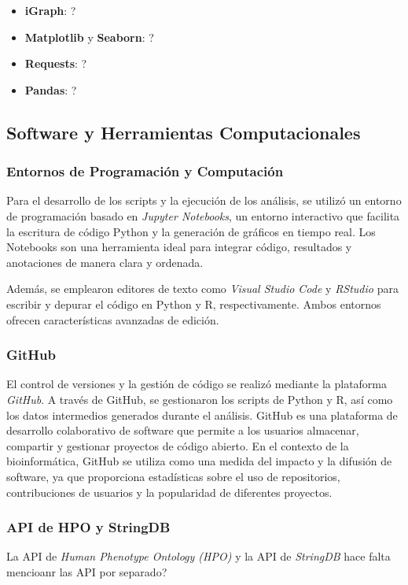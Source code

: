 \begin{itemize}
	\item \textbf{iGraph}: ?
	\item \textbf{Matplotlib} y \textbf{Seaborn}: ?
	
	\item \textbf{Requests}: ?
	\item \textbf{Pandas}: ?
\end{itemize}

\subsection{Software y Herramientas Computacionales}

\subsubsection{Entornos de Programación y Computación}
Para el desarrollo de los scripts y la ejecución de los análisis, se utilizó un entorno de programación basado en \textit{Jupyter Notebooks}, un entorno interactivo que facilita la escritura de código Python y la generación de gráficos en tiempo real. Los Notebooks son una herramienta ideal para integrar código, resultados y anotaciones de manera clara y ordenada.

Además, se emplearon editores de texto como \textit{Visual Studio Code} y \textit{RStudio} para escribir y depurar el código en Python y R, respectivamente. Ambos entornos ofrecen características avanzadas de edición.

\subsubsection{GitHub}
El control de versiones y la gestión de código se realizó mediante la plataforma \textit{GitHub}. A través de GitHub, se gestionaron los scripts de Python y R, así como los datos intermedios generados durante el análisis. GitHub es una plataforma de desarrollo colaborativo de software que permite a los usuarios almacenar, compartir y gestionar proyectos de código abierto. En el contexto de la bioinformática, GitHub se utiliza como una medida del impacto y la difusión de software, ya que proporciona estadísticas sobre el uso de repositorios, contribuciones de usuarios y la popularidad de diferentes proyectos\cite{dozmorov2018}. 


\subsubsection{API de HPO y StringDB}
La API de \textit{Human Phenotype Ontology (HPO)} y la API de \textit{StringDB} hace falta mencioanr las API por separado?

